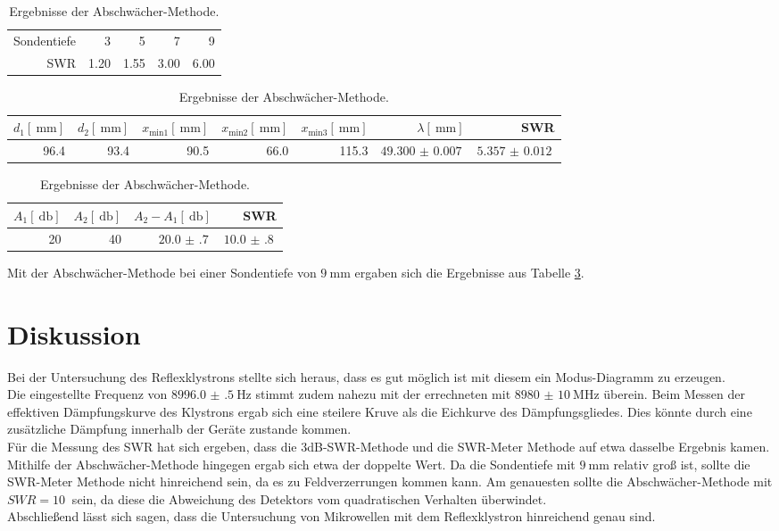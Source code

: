 \begin{table}
	\centering
	\caption{Ergebnisse der SWR-Meter Methode.}
	\begin{tabular}{r || r r r r|}
	 Sondentiefe &    3 &    5 &    7 &    9\\
	        SWR & 1.20 & 1.55 & 3.00 & 6.00\\
	\end{tabular}
\caption{Ergebnisse der 3dB-SWR-Methode.}
	\label{v3:1}
	\begin{tabular}{r r r r r r r}
	$d_\text{1}[\SI{}{\milli\meter}]$ & $d_\text{2}[\SI{}{\milli\meter}]$ & $x_\text{min1}[\SI{}{\milli\meter}]$ & $x_\text{min2}[\SI{}{\milli\meter}]$ & $x_\text{min3}[\SI{}{\milli\meter}]$ & $\lambda[\SI{}{\milli\meter}]$ & SWR\\
	\hline
	\hline
	96.4 & 93.4 & 90.5 & 66.0 & 115.3 & $\SI{49.300(7)}{}$ & $\SI{5.357(12)}{}$\\
	\end{tabular}
	\caption{Ergebnisse der Abschwächer-Methode.}
	\label{v3:2}
	\begin{tabular}{r r r r}
	$A_\text{1}[\SI{}{\decibel}]$ & $A_\text{2}[\SI{}{\decibel}]$ & $A_\text{2}-A_\text{1}[\SI{}{\decibel}]$ & SWR\\
	\hline
	\hline
	20 & 40 & $\SI{20.0(7)}{}$ & $\SI{10.0(8)}{}$\\
	\end{tabular}
	\label{v3:3}
\end{table}

Mit der Abschwächer-Methode bei einer Sondentiefe von $\SI{9}{\milli\meter}$ ergaben sich die Ergebnisse aus Tabelle \ref{v3:3}.\\


\section{Diskussion} %
\label{sec:diskussion}

Bei der Untersuchung des Reflexklystrons stellte sich heraus, dass es gut möglich ist mit diesem ein Modus-Diagramm zu erzeugen.\\

Die eingestellte Frequenz von $\SI{8996.0(5)}{\hertz}$ stimmt zudem nahezu mit der errechneten mit $\SI{8980(10)}{\mega\hertz}$ überein.
Beim Messen der effektiven Dämpfungskurve des Klystrons ergab sich eine steilere Kruve als die Eichkurve des Dämpfungsgliedes.
Dies könnte durch eine zusätzliche Dämpfung innerhalb der Geräte zustande kommen.\\

Für die Messung des SWR hat sich ergeben, dass die 3dB-SWR-Methode und die SWR-Meter Methode auf etwa dasselbe Ergebnis kamen.
Mithilfe der Abschwächer-Methode hingegen ergab sich etwa der doppelte Wert.
Da die Sondentiefe mit $\SI{9}{\milli\meter}$ relativ groß ist, sollte die SWR-Meter Methode nicht hinreichend sein, da es zu Feldverzerrungen kommen kann.
Am genauesten sollte die Abschwächer-Methode mit $SWR = \SI{10}{}$ sein, da diese die Abweichung des Detektors vom quadratischen Verhalten überwindet.\\

Abschließend lässt sich sagen, dass die Untersuchung von Mikrowellen mit dem Reflexklystron hinreichend genau sind.
